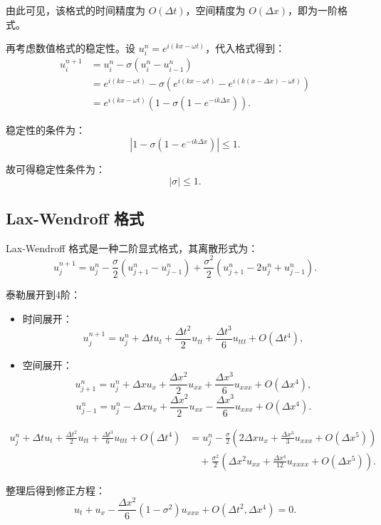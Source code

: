 \documentclass[12pt,a4paper]{article}
\begin{document}
由此可见，该格式的时间精度为 $O(\Delta t)$，空间精度为 $O(\Delta x)$，即为一阶格式。

再考虑数值格式的稳定性。设 $u_i^n = e^{i(kx - \omega t)}$，代入格式得到：
\[
\begin{aligned}
u_i^{n+1} &= u_i^n - \sigma \left( u_i^n - u_{i-1}^n \right) \\
&= e^{i(kx - \omega t)} - \sigma \left( e^{i(kx - \omega t)} - e^{i(k(x - \Delta x) - \omega t)} \right) \\
&= e^{i(kx - \omega t)} \left( 1 - \sigma (1 - e^{-ik\Delta x}) \right).
\end{aligned}
\]

稳定性的条件为：
\[
\left| 1 - \sigma (1 - e^{-ik\Delta x}) \right| \leq 1.
\]

故可得稳定性条件为：
\[
|\sigma| \leq 1.
\]

\subsection{Lax-Wendroff 格式}
Lax-Wendroff 格式是一种二阶显式格式，其离散形式为：
\[
u_j^{n+1} = u_j^n - \frac{\sigma}{2} \left( u_{j+1}^n - u_{j-1}^n \right) + \frac{\sigma^2}{2} \left( u_{j+1}^n - 2u_j^n + u_{j-1}^n \right).
\]

泰勒展开到4阶：
\begin{itemize}
    \item 时间展开：
    \[
    u_j^{n+1} = u_j^n + \Delta t u_t + \frac{\Delta t^2}{2} u_{tt} + \frac{\Delta t^3}{6} u_{ttt} + O(\Delta t^4),
    \]
    \item 空间展开：
    \[
    u_{j+1}^n = u_j^n + \Delta x u_x + \frac{\Delta x^2}{2} u_{xx} + \frac{\Delta x^3}{6} u_{xxx} + O(\Delta x^4),
    \]
    \[
    u_{j-1}^n = u_j^n - \Delta x u_x + \frac{\Delta x^2}{2} u_{xx} - \frac{\Delta x^3}{6} u_{xxx} + O(\Delta x^4).
    \]
\end{itemize}

\begin{align*}
u_j^n + \Delta t u_t + \frac{\Delta t^2}{2} u_{tt} + \frac{\Delta t^3}{6} u_{ttt} + O(\Delta t^4) &= u_j^n - \frac{\sigma}{2} \left( 2\Delta x u_x + \frac{\Delta x^3}{3} u_{xxx} + O(\Delta x^5) \right) \\
&\quad + \frac{\sigma^2}{2} \left( \Delta x^2 u_{xx} + \frac{\Delta x^4}{12} u_{xxxx} + O(\Delta x^5) \right).
\end{align*}

整理后得到修正方程：
\[
u_t + u_x - \frac{\Delta x^2}{6} (1-\sigma^2) u_{xxx} + O(\Delta t^2, \Delta x^4) = 0.
\]
\end{document}
